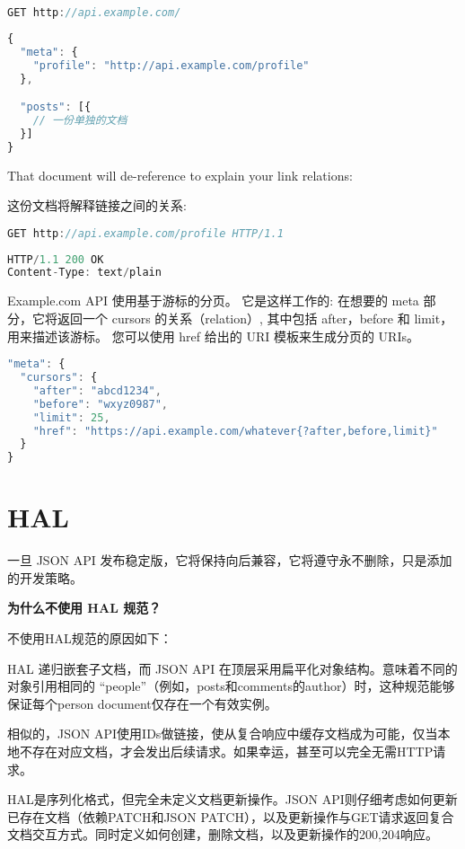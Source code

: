 \begin{lstlisting}[language=JavaScript]
GET http://api.example.com/
\end{lstlisting}


\begin{lstlisting}[language=JavaScript]
{
  "meta": {
    "profile": "http://api.example.com/profile"
  },

  "posts": [{
    // 一份单独的文档
  }]
}
\end{lstlisting}

That document will de-reference to explain your link relations:


这份文档将解释链接之间的关系:


\begin{lstlisting}[language=JavaScript]
GET http://api.example.com/profile HTTP/1.1
\end{lstlisting}


\begin{lstlisting}[language=JavaScript]
HTTP/1.1 200 OK
Content-Type: text/plain
\end{lstlisting}

Example.com API 使用基于游标的分页。 它是这样工作的: 在想要的 meta 部分，它将返回一个 cursors 的关系（relation）, 其中包括 after，before 和 limit，用来描述该游标。 您可以使用 href 给出的 URI 模板来生成分页的 URIs。

\begin{lstlisting}[language=JavaScript]
"meta": {
  "cursors": {
    "after": "abcd1234",
    "before": "wxyz0987",
    "limit": 25,
    "href": "https://api.example.com/whatever{?after,before,limit}"
  }
}
\end{lstlisting}

\section{HAL}

一旦 JSON API 发布稳定版，它将保持向后兼容，它将遵守永不删除，只是添加的开发策略。

\textbf{为什么不使用 HAL 规范？}

不使用HAL规范的原因如下：

\begin{compactitem}
\item HAL 递归嵌套子文档，而 JSON API 在顶层采用扁平化对象结构。意味着不同的对象引用相同的 “people”（例如，posts和comments的author）时，这种规范能够保证每个person document仅存在一个有效实例。

\item 相似的，JSON API使用IDs做链接，使从复合响应中缓存文档成为可能，仅当本地不存在对应文档，才会发出后续请求。如果幸运，甚至可以完全无需HTTP请求。

\item HAL是序列化格式，但完全未定义文档更新操作。JSON API则仔细考虑如何更新已存在文档（依赖PATCH和JSON PATCH），以及更新操作与GET请求返回复合文档交互方式。同时定义如何创建，删除文档，以及更新操作的200,204响应。
\end{compactitem}

